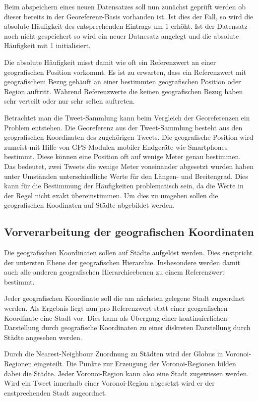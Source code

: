 			Beim abspeichern eines neuen Datensatzes soll nun zunächst geprüft werden ob dieser bereits in der Georeferenz-Basis vorhanden ist. 
			Ist dies der Fall, so wird die absolute Häufigkeit des entsprechenden Eintrags um 1 erhöht.
			Ist der Datensatz noch nicht gespeichert so wird ein neuer Datnesatz angelegt und die absolute Häufigkeit mit 1 initialisiert.

			Die absolute Häufigkeit misst damit wie oft ein Referenzwert an einer geografischen Position vorkommt.
			Es ist zu erwarten, dass ein Referenzwert mit geografischem Bezug gehäuft an einer bestimmten geografischen Position oder Region auftritt.
			Während Referenzwerte die keinen geografischen Bezug haben sehr verteilt oder nur sehr selten auftreten. 

			Betrachtet man die Tweet-Sammlung kann beim Vergleich der Georeferenzen ein Problem entstehen.
			Die Georeferenz aus der Tweet-Sammlung besteht aus den geografischen Koordinaten des zugehörigen Tweets.
			Die geografische Position wird zumeist mit Hilfe von GPS-Modulen mobiler Endgeräte wie Smartphones bestimmt. 
			Diese können eine Position oft auf wenige Meter genau bestimmen.
			Das bedeutet, zwei Tweets die wenige Meter voneinander abgesetzt wurden haben unter Umständen unterschiedliche Werte für den Längen- und Breitengrad.
			Dies kann für die Bestimmung der Häufigkeiten problematisch sein, da die Werte in der Regel nicht exakt übereinstimmen.
			Um dies zu umgehen sollen die geografischen Koodinaten auf Städte abgebildet werden.

		\subsection{Vorverarbeitung der geografischen Koordinaten}

			Die geografischen Koordinaten sollen auf Städte aufgelöst werden.
			Dies enstpricht der untersten Ebene der geografischen Hierarchie.
			Insbesondere werden damit auch alle anderen geografischen Hierarchieebenen zu einem Referenzwert bestimmt.

			Jeder geografischen Koordinate soll die am nächsten gelegene Stadt zugeordnet werden.
			Als Ergebnis liegt nun pro Referenzwert statt einer geografischen Koordinate eine Stadt vor.
			Dies kann als Übergang einer kontinuierlichen Darstellung durch geografische Koordinaten zu einer diskreten Darstellung durch Städte angesehen werden. 
			
			Durch die Nearest-Neighbour Zuordnung zu Städten wird der Globus in Voronoi-Regionen eingeteilt.
			Die Punkte zur Erzeugung der Voronoi-Regionen bilden dabei die Städte. 
			Jeder Voronoi-Region kann also eine Stadt zugewiesen werden.
			Wird ein Tweet innerhalb einer Voronoi-Region abgesetzt wird er der enstprechenden Stadt zugeordnet.

